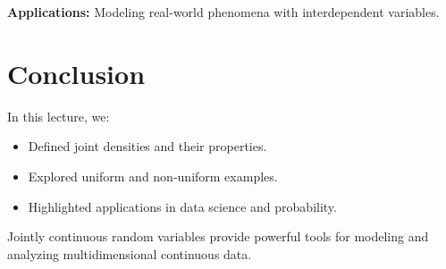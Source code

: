 \documentclass{article}
\begin{document}
\textbf{Applications:}
Modeling real-world phenomena with interdependent variables.

\section*{Conclusion}

In this lecture, we:
\begin{itemize}
  \item Defined joint densities and their properties.
  \item Explored uniform and non-uniform examples.
  \item Highlighted applications in data science and probability.
\end{itemize}

Jointly continuous random variables provide powerful tools for modeling and analyzing multidimensional continuous data.
\end{document}
